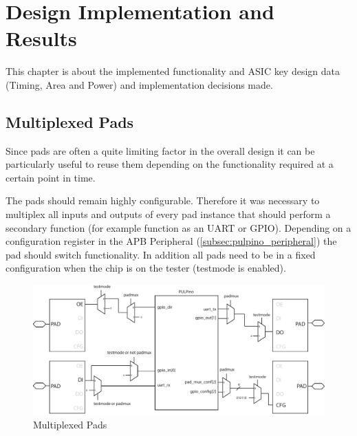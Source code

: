 

\chapter{Design Implementation and Results}

This chapter is about the implemented functionality and ASIC key design data (Timing, Area and Power) and implementation decisions made.

\section{Multiplexed Pads}

Since pads are often a quite limiting factor in the overall design it can be particularly useful to reuse them depending on the functionality required at a certain point in time.

The pads should remain highly configurable. Therefore it was necessary to multiplex all inputs and outputs of every pad instance that should perform a secondary function (for example function as an UART or GPIO). Depending on a configuration register in the APB \pulpino Peripheral (\ref{subsec:pulpino_peripheral}) the pad should switch functionality. In addition all pads need to be in a fixed configuration when the chip is on the tester (testmode is enabled).

\begin{figure}[tbh]
  \centering
  \includegraphics[width=\linewidth]{./figures/pad_muxes}
  \caption{Multiplexed Pads}
  \label{fig:pad_muxes}
\end{figure}


